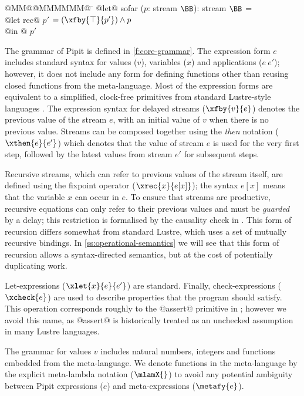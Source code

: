 
\begin{tabbing}
  @MM@\= @MMMMMM@ \= \kill
  @let@ sofar ($p$: stream $\BB$): stream $\BB$ = \\
    \> @let rec@ $p'$ $= (\xfby{\top}{p'}) \wedge p$ \\
    \> @in @ $p'$
\end{tabbing}


The grammar of Pipit is defined in \autoref{f:core-grammar}.
The expression form $e$ includes standard syntax for values ($v$), variables ($x$) and applications ($e~e'$); however, it does not include any form for defining functions other than reusing closed functions from the \fstar{} meta-language.
Most of the expression forms are equivalent to a simplified, clock-free primitives from standard Lustre-style languages \cite{caspi1995functional}.
The expression syntax for delayed streams ($\xfby{v}{e}$) denotes the previous value of the stream $e$, with an initial value of $v$ when there is no previous value.
Streams can be composed together using the \emph{then} notation ($\xthen{e}{e'}$) which denotes that the value of stream $e$ is used for the very first step, followed by the latest values from stream $e'$ for subsequent steps.

Recursive streams, which can refer to previous values of the stream itself, are defined using the fixpoint operator ($\xrec{x}{e[x]}$); the syntax $e[x]$ means that the variable $x$ can occur in $e$.
To ensure that streams are productive, recursive equations can only refer to their previous values and must be \emph{guarded} by a delay; this restriction is formalised by the causality check in \REF{}.
This form of recursion differs somewhat from standard Lustre, which uses a set of mutually recursive bindings.
In \autoref{ss:operational-semantics} we will see that this form of recursion allows a syntax-directed semantics, but at the cost of potentially duplicating work.

Let-expressions ($\xlet{x}{e}{e'}$) are standard.
Finally, check-expressions ($\xcheck{e}$) are used to describe properties that the program should satisfy.
This operation corresponds roughly to the @assert@ primitive in \fstar{}; however we avoid this name, as @assert@ is historically treated as an unchecked assumption in many Lustre languages.

The grammar for values $v$ includes natural numbers, integers and functions embedded from the \fstar{} meta-language.
We denote functions in the meta-language by the explicit meta-lambda notation ($\mlamX{}$) to avoid any potential ambiguity between Pipit expressions ($e$) and meta-expressions ($\metafy{e}$).

